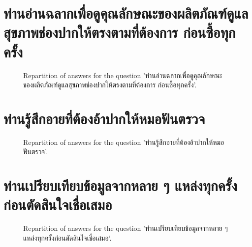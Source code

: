 \documentclass[12pt]{article}
\begin{document}
\clearpage{}
\section{ท่านอ่านฉลากเพื่อดูคุณลักษณะของผลิตภัณฑ์ดูแลสุขภาพช่องปากให้ตรงตามที่ต้องการ ก่อนซื้อทุกครั้ง}

\label{sec:75}


\begin{figure}[h!]
    \caption{\label{figure:q75-1}Repartition of answers for the question 'ท่านอ่านฉลากเพื่อดูคุณลักษณะของผลิตภัณฑ์ดูแลสุขภาพช่องปากให้ตรงตามที่ต้องการ ก่อนซื้อทุกครั้ง'.}
\end{figure}



\clearpage{}
\section{ท่านรู้สึกอายที่ต้องอ้าปากให้หมอฟันตรวจ}

\label{sec:76}


\begin{figure}[h!]
    \caption{\label{figure:q76-1}Repartition of answers for the question 'ท่านรู้สึกอายที่ต้องอ้าปากให้หมอฟันตรวจ'.}
\end{figure}



\clearpage{}
\section{ท่านเปรียบเทียบข้อมูลจากหลาย ๆ แหล่งทุกครั้งก่อนตัดสินใจเชื่อเสมอ}

\label{sec:77}


\begin{figure}[h!]
    \caption{\label{figure:q77-1}Repartition of answers for the question 'ท่านเปรียบเทียบข้อมูลจากหลาย ๆ แหล่งทุกครั้งก่อนตัดสินใจเชื่อเสมอ'.}
\end{figure}
\end{document}
